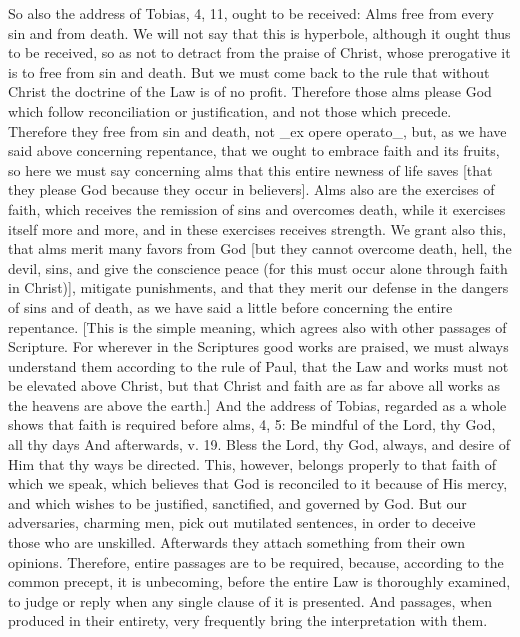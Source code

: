 So also the address of Tobias, 4, 11, ought to be received: Alms free
from every sin and from death.  We will not say that this is
hyperbole, although it ought thus to be received, so as not to
detract from the praise of Christ, whose prerogative it is to free
from sin and death.  But we must come back to the rule that without
Christ the doctrine of the Law is of no profit.  Therefore those alms
please God which follow reconciliation or justification, and not
those which precede.  Therefore they free from sin and death, not _ex
opere operato_, but, as we have said above concerning repentance,
that we ought to embrace faith and its fruits, so here we must say
concerning alms that this entire newness of life saves [that they
please God because they occur in believers].  Alms also are the
exercises of faith, which receives the remission of sins and
overcomes death, while it exercises itself more and more, and in
these exercises receives strength.  We grant also this, that alms
merit many favors from God [but they cannot overcome death, hell, the
devil, sins, and give the conscience peace (for this must occur alone
through faith in Christ)], mitigate punishments, and that they merit
our defense in the dangers of sins and of death, as we have said a
little before concerning the entire repentance.  [This is the simple
meaning, which agrees also with other passages of Scripture.  For
wherever in the Scriptures good works are praised, we must always
understand them according to the rule of Paul, that the Law and works
must not be elevated above Christ, but that Christ and faith are as
far above all works as the heavens are above the earth.] And the
address of Tobias, regarded as a whole shows that faith is required
before alms, 4, 5: Be mindful of the Lord, thy God, all thy days And
afterwards, v. 19. Bless the Lord, thy God, always, and desire of Him
that thy ways be directed.  This, however, belongs properly to that
faith of which we speak, which believes that God is reconciled to it
because of His mercy, and which wishes to be justified, sanctified,
and governed by God.  But our adversaries, charming men, pick out
mutilated sentences, in order to deceive those who are unskilled.
Afterwards they attach something from their own opinions.  Therefore,
entire passages are to be required, because, according to the common
precept, it is unbecoming, before the entire Law is thoroughly
examined, to judge or reply when any single clause of it is presented.
And passages, when produced in their entirety, very frequently
bring the interpretation with them.

